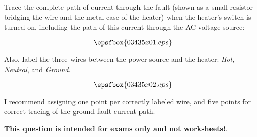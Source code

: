 

Trace the complete path of current through the fault (shown as a small resistor bridging the wire and the metal case of the heater) when the heater's switch is turned on, including the path of this current through the AC voltage source:

$$\epsfbox{03435x01.eps}$$

Also, label the three wires between the power source and the heater: {\it Hot}, {\it Neutral}, and {\it Ground}.







$$\epsfbox{03435x02.eps}$$

I recommend assigning one point per correctly labeled wire, and five points for correct tracing of the ground fault current path.







{\bf This question is intended for exams only and not worksheets!}.



